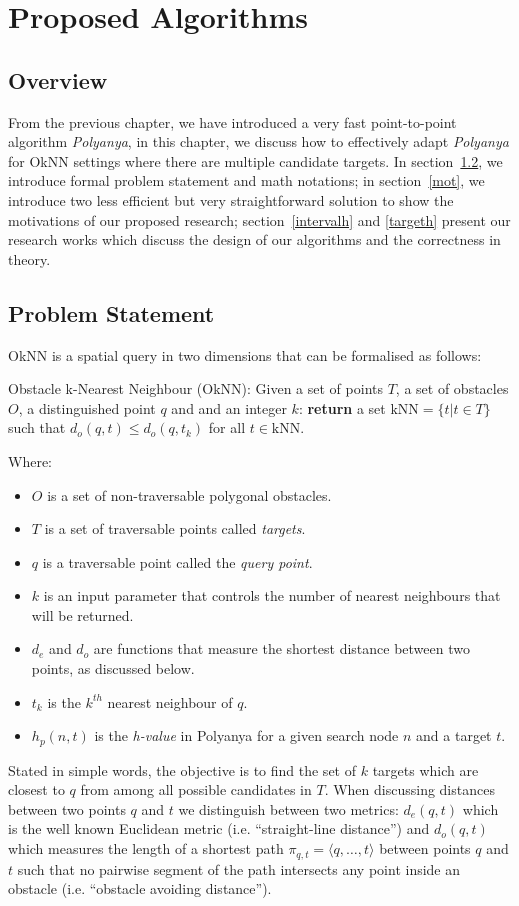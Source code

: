 \chapter{Proposed Algorithms}\label{proposedalgo}
\section{Overview}\label{proposedoverview}
From the previous chapter, we have introduced a very fast point-to-point algorithm \textit{Polyanya}, 
in this chapter, we discuss how to effectively adapt \textit{Polyanya} for OkNN settings where
there are multiple candidate targets. In section~\ref{prob}, we introduce formal problem
statement and math notations; in section~\ref{mot}, we introduce two less efficient but very
straightforward solution to show the motivations of our proposed research;
section~\ref{intervalh} and \ref{targeth} present our research works which discuss the design of our algorithms and the correctness in theory.

\section{Problem Statement}\label{prob}
OkNN is a spatial query in two dimensions that can be formalised as follows:
\begin{definition}{Obstacle k-Nearest Neighbour (OkNN):}\newline
Given a set of points $T$, a set of obstacles $O$, a distinguished point $q$ and and an integer $k$: 
\textbf{return} a set $\text{kNN} = \{t | t \in T\}$ such that $d_o(q, t) \le d_o(q, t_k)$ for all $t \in \text{kNN}$.
\end{definition}

\noindent Where:
\begin{itemize}[leftmargin=+1cm]
\item $O$ is a set of non-traversable polygonal obstacles.
\item $T$ is a set of traversable points called \emph{targets}.
\item $q$ is a traversable point called the \emph{query point}.
\item $k$ is an input parameter that controls the number of nearest neighbours that will be returned.
\item $d_e$ and $d_o$ are functions that measure the shortest distance between two points, as discussed below.
\item $t_k$ is the $k^{th}$ nearest neighbour of $q$.
\item $h_p(n, t)$ is the \textit{h-value} in Polyanya for a given search node $n$ and a target
  $t$.
\end{itemize}
\noindent
Stated in simple words, the objective is to find the set of $k$ targets which are closest to $q$ from among all possible candidates in $T$.
When discussing distances between two points $q$ and $t$ we distinguish between two metrics:
$d_e(q, t)$ which is the well known Euclidean metric (i.e. ``straight-line distance'')
and $d_o(q, t)$ which measures the length of a shortest path $\pi_{q, t} = \langle q, \ldots, t\rangle$ between points $q$ and $t$ such that
no pairwise segment of the path intersects any point inside an obstacle (i.e. ``obstacle avoiding distance'').


